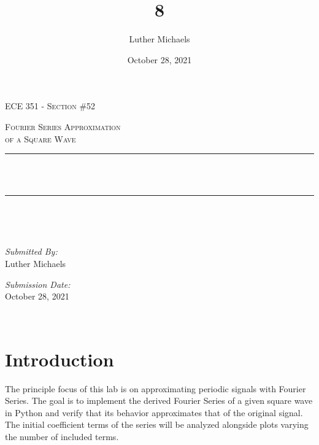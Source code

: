 \documentclass[12pt]{report}
\title{8}	%
\author{Luther Michaels}	%
\date{October 28, 2021}   %
\makeatletter
\let\thetitle\@title
\makeatother
\begin{document}
	
\begin{titlepage}
	\centering
	\vspace*{0.5 cm}
		
	\begin{center}    
		\textsc{\Large   ECE 351 - Section \#52}\\[2.0 cm]	
	\end{center}  
	\textsc{\Large Fourier Series Approximation \\ of a Square Wave  }\\[0.5 cm]
	\rule{\linewidth}{0.2 mm} \\[0.4 cm]
	{ \huge \bfseries \thetitle}\\
	\rule{\linewidth}{0.2 mm} \\[1.5 cm]
	\begin{minipage}{0.4\textwidth}
		\begin{flushleft} \large
		\end{flushleft}
	\end{minipage}~
	\begin{minipage}{0.4\textwidth}
		\begin{flushright} \large
			\emph{Submitted By:} \\
			Luther Michaels \break
			
			\emph{Submission Date:} \\
			October 28, 2021
		\end{flushright}
	\end{minipage}\\[2 cm]
\end{titlepage}
	

\tableofcontents
\pagebreak

\renewcommand{\thesection}{\arabic{section}}
\section{Introduction}

The principle focus of this lab is on approximating periodic signals with Fourier Series. The goal is to implement the derived Fourier Series of a given square wave in Python and verify that its behavior approximates that of the original signal. The initial coefficient terms of the series will be analyzed alongside plots varying the number of included terms. \\ 
\end{document}
